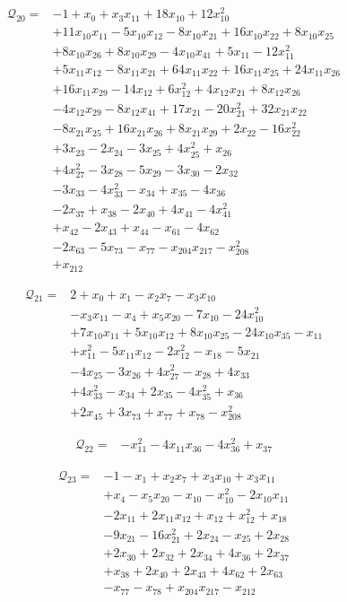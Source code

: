 \begin{align*}
\mathcal{Q}_{20}={}&-1+x_{0}+x_{3}x_{11}+18x_{10}+12x_{10}^{2}\\
&+11x_{10}x_{11}-5x_{10}x_{12}-8x_{10}x_{21}+16x_{10}x_{22}+8x_{10}x_{25}\\
&+8x_{10}x_{26}+8x_{10}x_{29}-4x_{10}x_{41}+5x_{11}-12x_{11}^{2}\\
&+5x_{11}x_{12}-8x_{11}x_{21}+64x_{11}x_{22}+16x_{11}x_{25}+24x_{11}x_{26}\\
&+16x_{11}x_{29}-14x_{12}+6x_{12}^{2}+4x_{12}x_{21}+8x_{12}x_{26}\\
&-4x_{12}x_{29}-8x_{12}x_{41}+17x_{21}-20x_{21}^{2}+32x_{21}x_{22}\\
&-8x_{21}x_{25}+16x_{21}x_{26}+8x_{21}x_{29}+2x_{22}-16x_{22}^{2}\\
&+3x_{23}-2x_{24}-3x_{25}+4x_{25}^{2}+x_{26}\\
&+4x_{27}^{2}-3x_{28}-5x_{29}-3x_{30}-2x_{32}\\
&-3x_{33}-4x_{33}^{2}-x_{34}+x_{35}-4x_{36}\\
&-2x_{37}+x_{38}-2x_{40}+4x_{41}-4x_{41}^{2}\\
&+x_{42}-2x_{43}+x_{44}-x_{61}-4x_{62}\\
&-2x_{63}-5x_{73}-x_{77}-x_{204}x_{217}-x_{208}^{2}\\
&+x_{212}
\end{align*}

\begin{align*}
\mathcal{Q}_{21}={}&2+x_{0}+x_{1}-x_{2}x_{7}-x_{3}x_{10}\\
&-x_{3}x_{11}-x_{4}+x_{5}x_{20}-7x_{10}-24x_{10}^{2}\\
&+7x_{10}x_{11}+5x_{10}x_{12}+8x_{10}x_{25}-24x_{10}x_{35}-x_{11}\\
&+x_{11}^{2}-5x_{11}x_{12}-2x_{12}^{2}-x_{18}-5x_{21}\\
&-4x_{25}-3x_{26}+4x_{27}^{2}-x_{28}+4x_{33}\\
&+4x_{33}^{2}-x_{34}+2x_{35}-4x_{35}^{2}+x_{36}\\
&+2x_{45}+3x_{73}+x_{77}+x_{78}-x_{208}^{2}
\end{align*}

\begin{align*}
\mathcal{Q}_{22}={}&-x_{11}^{2}-4x_{11}x_{36}-4x_{36}^{2}+x_{37}
\end{align*}

\begin{align*}
\mathcal{Q}_{23}={}&-1-x_{1}+x_{2}x_{7}+x_{3}x_{10}+x_{3}x_{11}\\
&+x_{4}-x_{5}x_{20}-x_{10}-x_{10}^{2}-2x_{10}x_{11}\\
&-2x_{11}+2x_{11}x_{12}+x_{12}+x_{12}^{2}+x_{18}\\
&-9x_{21}-16x_{21}^{2}+2x_{24}-x_{25}+2x_{28}\\
&+2x_{30}+2x_{32}+2x_{34}+4x_{36}+2x_{37}\\
&+x_{38}+2x_{40}+2x_{43}+4x_{62}+2x_{63}\\
&-x_{77}-x_{78}+x_{204}x_{217}-x_{212}
\end{align*}

